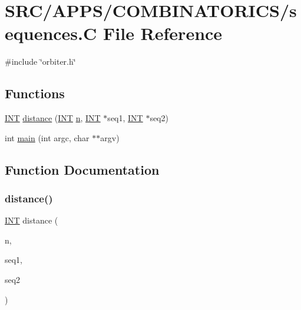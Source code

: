 \hypertarget{sequences_8_c}{}\section{S\+R\+C/\+A\+P\+P\+S/\+C\+O\+M\+B\+I\+N\+A\+T\+O\+R\+I\+C\+S/sequences.C File Reference}
\label{sequences_8_c}
{\ttfamily \#include \char`\"{}orbiter.\+h\char`\"{}}\newline
\subsection*{Functions}
\begin{DoxyCompactItemize}
\item 
\mbox{\hyperlink{galois_8h_a09fddde158a3a20bd2dcadb609de11dc}{I\+NT}} \mbox{\hyperlink{sequences_8_c_a3f4d273239de315efc094f519dd3b25d}{distance}} (\mbox{\hyperlink{galois_8h_a09fddde158a3a20bd2dcadb609de11dc}{I\+NT}} \mbox{\hyperlink{simeon_8_c_a7f2cd26777ce0ff3fdaf8d02aacbddfb}{n}}, \mbox{\hyperlink{galois_8h_a09fddde158a3a20bd2dcadb609de11dc}{I\+NT}} $\ast$seq1, \mbox{\hyperlink{galois_8h_a09fddde158a3a20bd2dcadb609de11dc}{I\+NT}} $\ast$seq2)
\item 
int \mbox{\hyperlink{sequences_8_c_a3c04138a5bfe5d72780bb7e82a18e627}{main}} (int argc, char $\ast$$\ast$argv)
\end{DoxyCompactItemize}


\subsection{Function Documentation}
\mbox{\label{sequences_8_c_a3f4d273239de315efc094f519dd3b25d}} 
\subsubsection{\texorpdfstring{distance()}{distance()}}
{\footnotesize\ttfamily \mbox{\hyperlink{galois_8h_a09fddde158a3a20bd2dcadb609de11dc}{I\+NT}} distance (\begin{DoxyParamCaption}\item[{\mbox{\hyperlink{galois_8h_a09fddde158a3a20bd2dcadb609de11dc}{I\+NT}}}]{n,  }\item[{\mbox{\hyperlink{galois_8h_a09fddde158a3a20bd2dcadb609de11dc}{I\+NT}} $\ast$}]{seq1,  }\item[{\mbox{\hyperlink{galois_8h_a09fddde158a3a20bd2dcadb609de11dc}{I\+NT}} $\ast$}]{seq2 }\end{DoxyParamCaption})}

